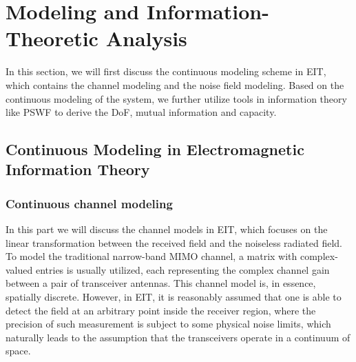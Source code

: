\documentclass[journal,twocolumn]{IEEEtran}
\begin{document}
\section{Modeling and Information-Theoretic Analysis}
In this section, we will first discuss the continuous modeling scheme in EIT, which contains the channel modeling and the noise field modeling. Based on the continuous modeling of the system, we further utilize tools in information theory like PSWF to derive the DoF, mutual information and capacity.
\subsection{Continuous Modeling in Electromagnetic Information Theory}
\subsubsection{Continuous channel modeling}
In this part we will discuss the channel models in EIT, which focuses on the linear transformation between the received field and the noiseless radiated field. 
To model the traditional narrow-band MIMO channel, a matrix with complex-valued entries is usually utilized, each representing the complex channel gain between a pair of transceiver antennas. 
This channel model is, in essence, spatially discrete. 
However, in EIT, it is reasonably assumed that one is able to detect the field at an arbitrary point inside the receiver region, where the precision of such measurement is subject to some physical noise limits, which naturally leads to the assumption that the transceivers operate in a continuum of space.  
\end{document}
